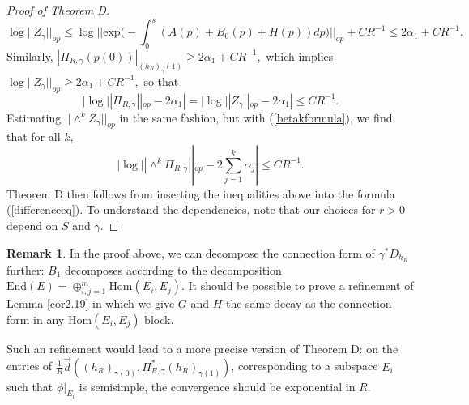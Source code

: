 \documentclass[10pt]{amsart}
\theoremstyle{definition}
\newtheorem{remark}[thm]{Remark}
\begin{document}
\begin{proof}[Proof of Theorem D]
$$\log ||Z_\gamma||_{op}\leq \log ||\textrm{exp}\Big (-\int_0^s(A(p)+B_0(p)+H(p))dp\Big )||_{op}+CR^{-1}\leq 2\alpha_1+CR^{-1}.$$ Similarly, $|\Pi_{R,\gamma}(p(0))|_{(h_R)_{\gamma}(1)}\geq 2\alpha_1+CR^{-1},$ which implies $\log ||Z_\gamma||_{op}\geq 2\alpha_1+CR^{-1},$ so that $$|\log ||\Pi_{R,\gamma}||_{op}- 2\alpha_1|=|\log ||Z_\gamma||_{op}- 2\alpha_1|\leq CR^{-1}.$$ Estimating $||\wedge^k Z_\gamma||_{op}$ in the same fashion, but with (\ref{betakformula}), we find that for all $k$, $$|\log ||\wedge^k \Pi_{R,\gamma}||_{op}
-2\sum_{j=1}^k\alpha_j|\leq CR^{-1}.$$ Theorem D then follows from inserting the inequalities above into the formula (\ref{differenceeq}). To understand the dependencies, note that our choices for $r>0$ depend on $S$ and $\gamma$.
\end{proof}
\begin{remark}
In the proof above, we can decompose the connection form of $\gamma^*D_{h_R}$ further: $B_1$ decomposes according to the decomposition $\textrm{End}(E)=\oplus_{i,j=1}^m\textrm{Hom}(E_i,E_j)$. It should be possible to prove a refinement of Lemma \ref{cor2.19} in which we give $G$ and $H$ the same decay as the connection form in any $\textrm{Hom}(E_i,E_j)$ block.

Such an refinement would lead to a more precise version of Theorem D: on the entries of $\frac{1}{R}\vec{d}((h_R)_{\gamma(0)},\Pi_{R,\gamma}^*(h_R)_{\gamma(1)})$, corresponding to a subspace $E_i$ such that $\phi|_{E_i}$ is semisimple, the convergence should be exponential in $R$.
\end{remark}
\end{document}
